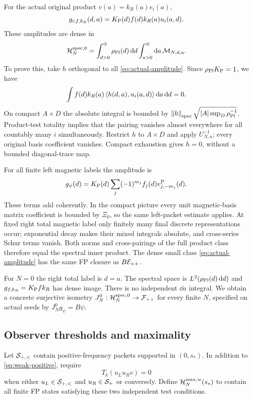 For the actual original product $v(a)=k_R(a)e_i(a)$,
\begin{equation}
 g_{i;f,k_R}(d,a)=K_{\mathrm P}(d)f(d)k_R(a)u_i(a,d).
 \label{eq:actual-amplitude}
\end{equation}
These amplitudes are dense in
\begin{equation}
 \mathcal H_N^{\mathrm{spec},0}=\int_{d>0}^{\oplus}\rho_{\mathrm{Pl}}(d)\mathop{}\!\mathrm d d
                  \int_{a>0}^{\oplus}\mathop{}\!\mathrm d a\,\mathcal M_{N,d,a}.
 \label{eq:full-physical-spectrum}
\end{equation}
To prove this, take $h$ orthogonal to all \eqref{eq:actual-amplitude}.
Since $\rho_{\mathrm{Pl}}K_{\mathrm P}=1$, we have
\[
 \int f(d)k_R(a)\left\langle h(d,a),u_i(a,d)\right\rangle\mathop{}\!\mathrm d a\mathop{}\!\mathrm d d=0.
\]
On compact $A\times D$ the absolute integral is bounded by
$\left\lVert h\right\rVert_{\mathrm{spec}}\sqrt{|A|\sup_D\rho_{\mathrm{Pl}}^{-1}}$.
Product-test totality implies that the pairing vanishes almost everywhere
for all countably many $i$ simultaneously. Restrict $h$ to $A\times D$
and apply $U_{N,a}^{-1}$; every original basis coefficient vanishes.
Compact exhaustion gives $h=0$, without a bounded diagonal-trace map.

For all finite left magnetic labels the amplitude is
\begin{equation}
 g_\psi(d)=K_{\mathrm P}(d)\sum_j(-1)^{m_j}f_j(d)v^{\mathrm P}_{j,-m_j}(d).
 \label{eq:finite-magnetic-amplitude}
\end{equation}
These terms add coherently. In the compact picture every unit
magnetic-basis matrix coefficient is bounded by $\Xi_0$, so the same
left-packet estimate applies. At fixed right total magnetic label only
finitely many final discrete representations occur; exponential decay
makes their mixed integrals absolute, and cross-series Schur terms vanish.
Both norms and cross-pairings of the full product class therefore equal
the spectral inner product. The dense small class
\eqref{eq:actual-amplitude} has the same FP closure as $B\mathcal E_{++}$.

For $N=0$ the right total label is $d=a$. The spectral space is
$L^2(\rho_{\mathrm{Pl}}(d)\mathop{}\!\mathrm d d)$ and $g_{f,k_R}=K_{\mathrm P} f k_R$ has dense image.
There is no independent $\dd a$ integral. We obtain a concrete
surjective isometry $J_N^0:\mathcal H_N^{\mathrm{spec},0}\to\mathcal F_{++}$ for every finite
$N$, specified on actual seeds by $J_N^0g_\psi=B\psi$.

\subsection{Observer thresholds and maximality}
Let $\mathcal S_{+,<}$ contain positive-frequency packets supported in
$(0,s_*)$. In addition to \eqref{eq:weak-positive}, require
\begin{equation}
 T_k(u_Lu_Rv)=0
 \label{eq:weak-threshold}
\end{equation}
when either $u_L\in\mathcal S_{+,<}$ and $u_R\in\mathcal S_+$ or conversely.
Define $\mathcal H_N^{\max,w}(s_*)$ to contain all finite FP states satisfying
these two independent test conditions.

